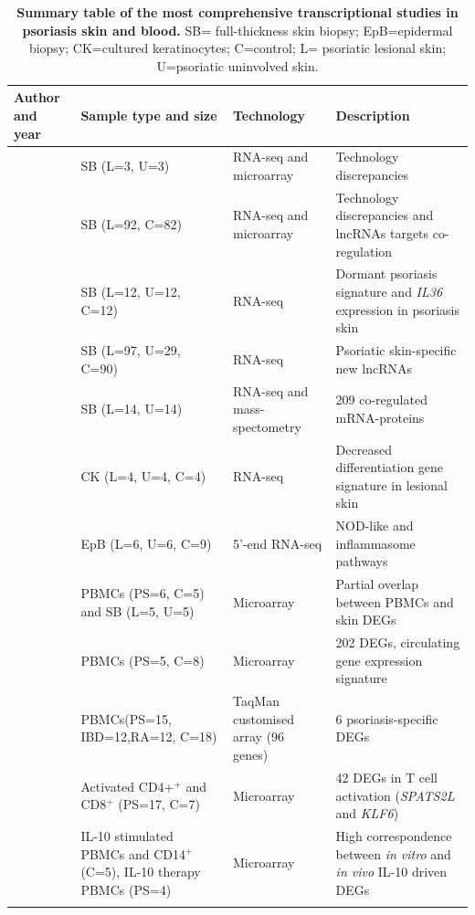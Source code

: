 \begin{landscape}
\renewcommand{\arraystretch}{0.7}
\begin{center}
\begin{longtable}[htp]{p{.25\textheight} p{.40\textheight} p{.25\textheight} p{.60\textheight}}
\caption[Summary table of the most comprehensive transcriptional studies in psoriasis skin and blood.]{\textbf{Summary table of the most comprehensive transcriptional studies in psoriasis skin and blood.} SB= full-thickness skin biopsy; EpB=epidermal biopsy; CK=cultured keratinocytes; C=control; L= psoriatic lesional skin; U=psoriatic uninvolved skin.}
\label{tab:Skin_and_blood_transcriptomics} \\
\toprule
\textbf{Author and year} & \textbf{Sample type and size} & \textbf{Technology} & \textbf{Description}\\
\midrule
\midrule
\parencite{Jabbari2012}	   & SB (L=3, U=3)         & RNA-seq and microarray & Technology discrepancies     \\
\parencite{Li2014}	       & SB (L=92, C=82)       & RNA-seq and microarray & Technology discrepancies and lncRNAs targets co-regulation\\
\parencite{Keermann2015}	 & SB (L=12, U=12, C=12) & RNA-seq                & Dormant psoriasis signature and \textit{IL36} expression in psoriasis skin \\
\parencite{Tsoi2015}	     & SB (L=97, U=29, C=90) & RNA-seq                & Psoriatic skin-specific new lncRNAs\\
\parencite{Swindell2015}   & SB (L=14, U=14)       & RNA-seq and mass-spectometry & 209 co-regulated mRNA-proteins \\
\parencite{Swindell2017}	 & CK (L=4, U=4, C=4)    & RNA-seq                & Decreased differentiation gene signature in lesional skin\\
\parencite{Tervaniemi2016} & EpB (L=6, U=6, C=9)   & 5'-end RNA-seq                & NOD-like and inflammasome pathways\\
\parencite{Coda2012}   & PBMCs (PS=6, C=5) and SB (L=5, U=5)   & Microarray             & Partial overlap between PBMCs and skin DEGs\\
\parencite{Lee2009}	   & PBMCs (PS=5, C=8)	      & Microarray             & 202 DEGs, circulating gene expression signature \\
\parencite{Mesko2010}  & PBMCs(PS=15, IBD=12,RA=12, C=18)      &  TaqMan customised array (96 genes)     & 6 psoriasis-specific DEGs \\
\parencite{Palau2013}	 & Activated CD4+$^+$ and CD8$^+$  (PS=17, C=7) & Microarray  & 42 DEGs in T cell activation (\textit{SPATS2L} and \textit{KLF6})\\
\parencite{Jung2004}  & IL-10 stimulated PBMCs and CD14$^+$ (C=5), IL-10 therapy PBMCs (PS=4) & Microarray  & High correspondence between \textit{in vitro} and \textit{in vivo} IL-10 driven DEGs \\
\bottomrule
\medskip
\end{longtable}
\end{center}
\end{landscape}

